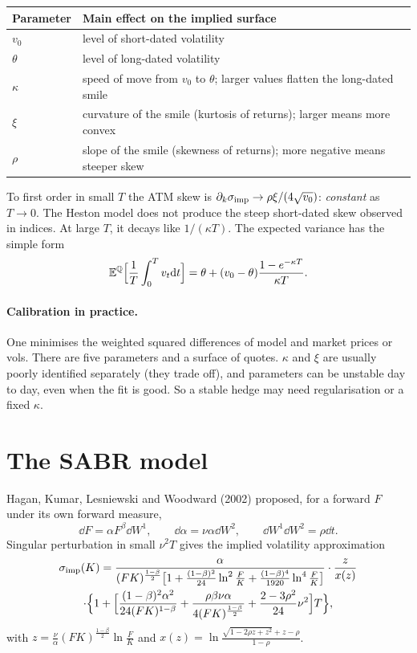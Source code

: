 \begin{center}
\begin{tabular}{ll}
\toprule
Parameter & Main effect on the implied surface\\
\midrule
$v_0$ & level of short-dated volatility\\
$\theta$ & level of long-dated volatility\\
$\kappa$ & speed of move from $v_0$ to $\theta$; larger values flatten the long-dated smile\\
$\xi$ & curvature of the smile (kurtosis of returns); larger means more convex\\
$\rho$ & slope of the smile (skewness of returns); more negative means steeper skew\\
\bottomrule
\end{tabular}
\end{center}

To first order in small $T$ the ATM skew is $\partial_k\sigma_{\rm imp}\to\rho\xi/(4\sqrt{v_0})$: \emph{constant} as $T\to0$. The Heston model does not produce the steep short-dated skew observed in indices. At large $T$, it decays like $1/(\kappa T)$. The expected variance has the simple form
\[
\mathbb{E}^{\mathbb{Q}}\Bigl[\frac1T\int_0^Tv_t\mathrm{d} t\Bigr]=\theta+(v_0-\theta)\frac{1-e^{-\kappa T}}{\kappa T}.
\]

\paragraph{Calibration in practice.} One minimises the weighted squared differences of model and market prices or vols. There are five parameters and a surface of quotes. $\kappa$ and $\xi$ are usually poorly identified separately (they trade off), and parameters can be unstable day to day, even when the fit is good. So a stable hedge may need regularisation or a fixed $\kappa$.

\section{The SABR model}

Hagan, Kumar, Lesniewski and Woodward (2002) proposed, for a forward $F$ under its own forward measure,
\[
\dd F=\alpha F^\beta\dd W^1,\qquad\dd\alpha=\nu\alpha\dd W^2,\qquad\dd W^1\dd W^2=\rho\dd t.
\]
Singular perturbation in small $\nu^2T$ gives the implied volatility approximation
\begin{multline*}
\sigma_{\rm imp}(K)=\frac{\alpha}{(FK)^{\frac{1-\beta}{2}}\bigl[1+\frac{(1-\beta)^2}{24}\ln^2\frac FK+\frac{(1-\beta)^4}{1920}\ln^4\frac FK\bigr]}\cdot\frac{z}{x(z)}\\
\cdot\Bigl\{1+\Bigl[\frac{(1-\beta)^2\alpha^2}{24(FK)^{1-\beta}}+\frac{\rho\beta\nu\alpha}{4(FK)^{\frac{1-\beta}{2}}}+\frac{2-3\rho^2}{24}\nu^2\Bigr]T\Bigr\},
\end{multline*}
with $z=\frac\nu\alpha(FK)^{\frac{1-\beta}{2}}\ln\frac FK$ and $x(z)=\ln\frac{\sqrt{1-2\rho z+z^2}+z-\rho}{1-\rho}$.

